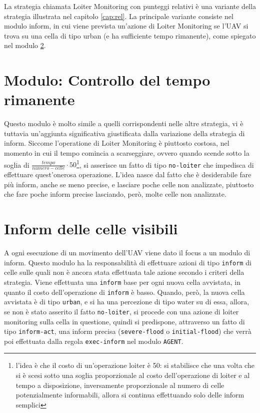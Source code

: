 La strategia chiamata Loiter Monitoring con punteggi relativi è una variante della strategia illustrata nel capitolo \ref{cap:rel}. La principale variante consiste nel modulo inform, in cui viene prevista un'azione di Loiter Monitoring se l'UAV si trova su una cella di tipo urban (e ha sufficiente tempo rimanente), come spiegato nel modulo \ref{sec:loiter-base-inform}.

\section{Modulo: Controllo del tempo rimanente} \label{sec:loiter-base-tempo}
Questo modulo è molto simile a quelli corrispondenti nelle altre strategia, vi è tuttavia un'aggiunta significativa giustificata dalla variazione della strategia di inform. Siccome l'operatione di Loiter Monitoring è piuttosto costosa, nel momento in cui il tempo comincia a scarseggiare, ovvero quando scende sotto la soglia di $ \frac{tempo}{numero-celle} \cdot 50 $\footnote{l'idea è che il costo di un'operazione loiter è 50: si stabilisce che una volta che si è scesi sotto una soglia proporzionale al costo dell'operazione di loiter e al tempo a disposizione, inversamente proporzionale al numero di celle potenzialmente informabili, allora si continua effettuando solo delle inform semplici}, si asserisce un fatto di tipo \texttt{no-loiter} che impedisca di effettuare quest'onerosa operazione. L'idea nasce dal fatto che è desiderabile fare più inform, anche se meno precise, e lasciare poche celle non analizzate, piuttosto che fare poche inform precise lasciando, però, molte celle non analizzate.

\section{Inform delle celle visibili} \label{sec:loiter-base-inform}
A ogni esecuzione di un movimento dell'UAV viene dato il focus a un modulo di inform. Questo modulo ha la responsabilità di effettuare azioni di tipo \texttt{inform} di celle sulle quali non è ancora stata effettuata tale azione secondo i criteri della strategia. Viene effettuata una \texttt{inform} base per ogni nuova cella avvistata, in quanto il costo dell'operazione di \texttt{inform} è basso. Quando, però, la nuova cella avvistata è di tipo \texttt{urban}, e si ha una percezione di tipo water su di essa, allora, se non è stato asserito il fatto \texttt{no-loiter}, si procede con una azione di loiter monitoring sulla cella in questione, quindi si predispone, attraverso un fatto di tipo \texttt{inform-act}, una inform precisa (\texttt{severe-flood} o \texttt{initial-flood}) che verrà poi effettuata dalla regola \texttt{exec-inform} nel modulo \texttt{AGENT}.
